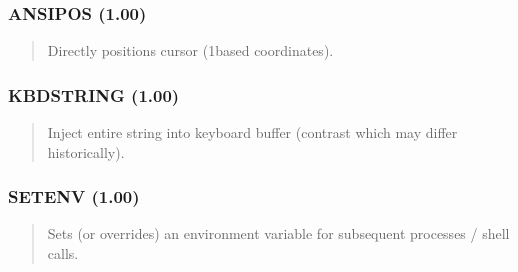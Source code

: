 \documentclass[letterpaper,10pt,english]{sphinxmanual}
\begin{document}
\subsubsection{ANSIPOS (1.00)}
\label{\detokenize{ppl:ansipos-1-00}}\begin{quote}

\sphinxAtStartPar
{}
\begin{description}
\sphinxAtStartPar
Directly positions cursor (1\sphinxhyphen{}based coordinates).

\end{description}
\end{quote}


\subsubsection{KBDSTRING (1.00)}
\label{\detokenize{ppl:kbdstring-1-00}}\begin{quote}

\sphinxAtStartPar
{}
\begin{description}
\sphinxAtStartPar
Inject entire string into keyboard buffer (contrast  which may differ historically).

\end{description}
\end{quote}


\subsubsection{SETENV (1.00)}
\label{\detokenize{ppl:setenv-1-00}}\begin{quote}

\sphinxAtStartPar
{}
\begin{description}
\sphinxAtStartPar
Sets (or overrides) an environment variable for subsequent processes / shell calls.

\end{description}
\end{quote}
\end{document}

